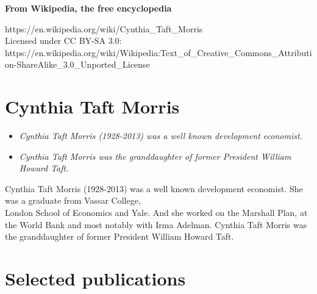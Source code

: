 \textbf{From Wikipedia, the free encyclopedia}

https://en.wikipedia.org/wiki/Cynthia\_Taft\_Morris\\
Licensed under CC BY-SA 3.0:\\
https://en.wikipedia.org/wiki/Wikipedia:Text\_of\_Creative\_Commons\_Attribution-ShareAlike\_3.0\_Unported\_License

\section{Cynthia Taft Morris}\label{cynthia-taft-morris}

\begin{itemize}
\item
  \emph{Cynthia Taft Morris (1928-2013) was a well known development
  economist.}
\item
  \emph{Cynthia Taft Morris was the granddaughter of former President
  William Howard Taft.}
\end{itemize}

Cynthia Taft Morris (1928-2013) was a well known development economist.
She was a graduate from Vassar College,\\
London School of Economics and Yale. And she worked on the Marshall
Plan, at the World Bank and most notably with Irma Adelman. Cynthia Taft
Morris was the granddaughter of former President William Howard Taft.

\section{Selected publications}\label{selected-publications}

